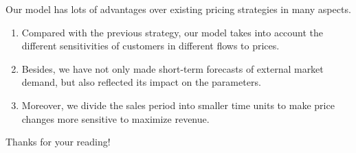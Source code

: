 Our model has lots of advantages over existing pricing strategies in many aspects.
\begin{enumerate}
    \item Compared with the previous strategy, our model takes into account the different sensitivities of customers in different flows to prices.
    \item Besides, we have not only made short-term forecasts of external market demand, but also reflected its impact on the parameters.
    \item Moreover, we divide the sales period into smaller time units to make price changes more sensitive to maximize revenue.
\end{enumerate}

Thanks for your reading!


